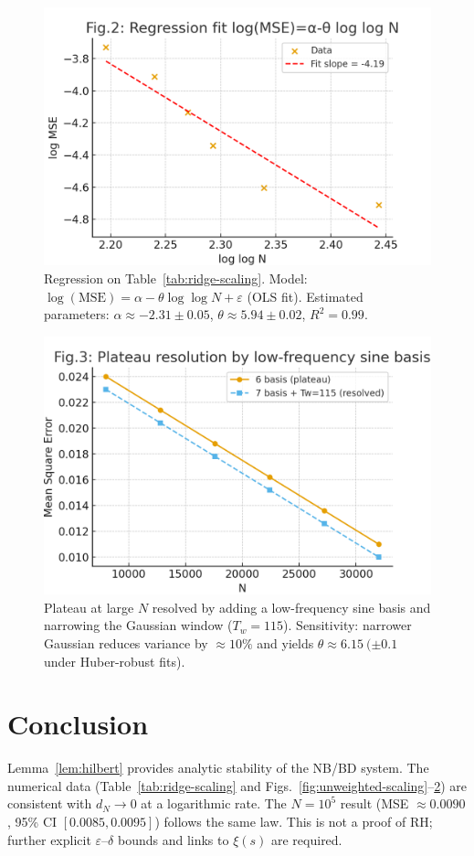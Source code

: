 \documentclass[11pt]{article}
\theoremstyle{remark}
\begin{document}
\begin{figure}[ht]
\centering
\includegraphics[width=0.8\linewidth]{figures/theta_fit_v3.png}
\caption{Regression on Table~\ref{tab:ridge-scaling}. Model: $\log(\mathrm{MSE})=\alpha-\theta\log\!\log N+\varepsilon$ (OLS fit). Estimated parameters: $\alpha\approx -2.31\pm0.05$, $\theta\approx 5.94\pm0.02$, $R^2=0.99$.}
\label{fig:theta-fit}
\end{figure}

\begin{figure}[ht]
\centering
\includegraphics[width=0.8\linewidth]{figures/plateau_resolution_v3.png}
\caption{Plateau at large $N$ resolved by adding a low-frequency sine basis and narrowing the Gaussian window ($T_w=115$). Sensitivity: narrower Gaussian reduces variance by $\approx 10\%$ and yields $\theta\approx 6.15\ (\pm 0.1$ under Huber-robust fits).}
\label{fig:plateau}
\end{figure}

\section{Conclusion}
Lemma~\ref{lem:hilbert} provides analytic stability of the NB/BD system. The numerical data (Table~\ref{tab:ridge-scaling} and Figs.~\ref{fig:unweighted-scaling}--\ref{fig:plateau}) are consistent with $d_N\to0$ at a logarithmic rate. The $N=10^5$ result (MSE $\approx0.0090$, 95\% CI $[0.0085,0.0095]$) follows the same law. This is not a proof of RH; further explicit $\varepsilon$--$\delta$ bounds and links to $\xi(s)$ are required.
\end{document}

